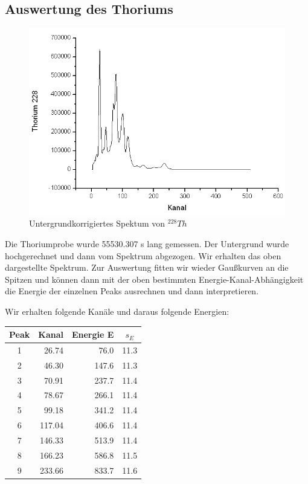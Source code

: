 \clearpage %

\subsection{Auswertung des Thoriums}

\begin{figure}[H]
\centering \includegraphics[width = \textwidth]{auswertung/Thoriumganz.png}
\caption{Untergrundkorrigiertes Spektum von $^{228}Th$}
\end{figure}

Die Thoriumprobe wurde 55530.307 s lang gemessen. Der Untergrund wurde hochgerechnet und dann vom Spektrum abgezogen. Wir erhalten das oben dargestellte Spektrum. Zur Auswertung fitten wir wieder Gaußkurven an die Spitzen und können dann mit der oben bestimmten Energie-Kanal-Abhängigkeit die Energie der einzelnen Peaks ausrechnen und dann interpretieren.

Wir erhalten folgende Kanäle und daraus folgende Energien:

\begin{center}
\begin{tabular}{| c | r | r | c |} \hline
Peak & Kanal & Energie E & $s_E$\\ \hline
1 & 26.74 & 76.0 & 11.3\\
2 & 46.30 & 147.6 & 11.3\\
3 & 70.91 & 237.7 & 11.4\\
4 & 78.67 & 266.1 & 11.4\\
5 & 99.18 & 341.2 & 11.4\\
6 & 117.04 & 406.6 & 11.4\\
7 & 146.33 & 513.9 & 11.4\\
8 & 166.23 & 586.8 & 11.5\\
9 & 233.66 & 833.7 & 11.6\\ \hline
\end{tabular}
\end{center}

